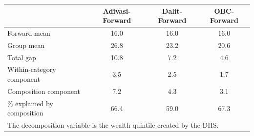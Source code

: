 \begin{tabular}{l*{3}{c}}
\hline\hline
            &\multicolumn{1}{c}{Adivasi-Forward}&\multicolumn{1}{c}{Dalit-Forward}&\multicolumn{1}{c}{OBC-Forward}\\
\hline
\hline
Forward mean&        16.0&        16.0&        16.0\\
Group mean  &        26.8&        23.2&        20.6\\
Total gap   &        10.8&         7.2&         4.6\\
Within-category component&         3.5&         2.5&         1.7\\
Composition component&         7.2&         4.3&         3.1\\
\% explained by composition&        66.4&        59.0&        67.3\\
\hline\hline
\multicolumn{4}{l}{\footnotesize \parbox[t]{0.95\linewidth}{The decomposition variable is the wealth quintile created by the DHS.}}\\
\end{tabular}
